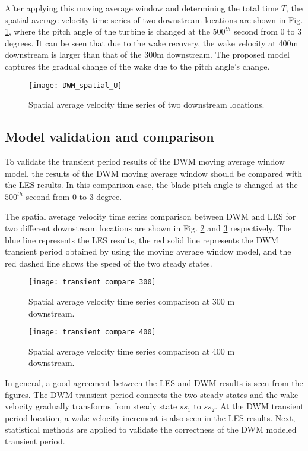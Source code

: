 \documentclass{umthesis}
\begin{document}
After applying this moving average window and determining the total time $T$, the spatial average velocity time series of two downstream locations are shown in Fig. \ref{fig:DWM_spatial_U}, where the pitch angle of the turbine is changed at the $500^{th}$ second from 0 to 3 degrees. It can be seen that due to the wake recovery, the wake velocity at 400m downstream is larger than that of the 300m downstream. The proposed model captures the gradual change of the wake due to the pitch angle's change.

\begin{figure}
  \centering
  \texttt{[image: DWM\_spatial\_U]}
  \caption{Spatial average velocity time series of two downstream locations.}\label{fig:DWM_spatial_U}
\end{figure}

\subsection{Model validation and comparison}

To validate the transient period results of the DWM moving average window model, the results of the DWM moving average window should be compared with the LES results. In this comparison case, the blade pitch angle is changed at the $500^{th}$ second from 0 to 3 degree.  

The spatial average velocity time series comparison between DWM and LES for two different downstream locations are shown in Fig. \ref{fig:transient_compare_300} and \ref{fig:transient_compare_400} respectively. The blue line represents the LES results, the red solid line represents the DWM transient period obtained by using the moving average window model, and the red dashed line shows the speed of the two steady states.
 
\begin{figure}
  \centering
  \texttt{[image: transient\_compare\_300]}
  \caption{Spatial average velocity time series comparison at 300 m downstream.}\label{fig:transient_compare_300}
\end{figure}

\begin{figure}
  \centering
  \texttt{[image: transient\_compare\_400]}
  \caption{Spatial average velocity time series comparison at 400 m downstream.}\label{fig:transient_compare_400}
\end{figure}

In general, a good agreement between the LES and DWM results is seen from the figures. The DWM transient period connects the two steady states and the wake velocity gradually transforms from steady state $ss_1$ to $ss_2$. At the DWM transient period location, a wake velocity increment is also seen in the LES results. Next, statistical methods are applied to validate the correctness of the DWM modeled transient period.
\end{document}
